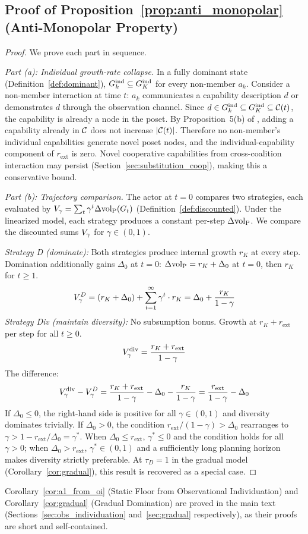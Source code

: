 \subsection{Proof of Proposition~\ref{prop:anti_monopolar} (Anti-Monopolar Property)}
\label{app:proof_anti_monopolar}

\begin{proof}
We prove each part in sequence.

\emph{Part (a): Individual growth-rate collapse.} In a fully dominant state
(Definition~\ref{def:dominant}), $G_{k}^{\mathrm{ind}} \subseteq G_K^{\mathrm{ind}}$
for every non-member $a_k$. Consider a non-member interaction at time $t$:
$a_k$ communicates a capability description $d$ or demonstrates $d$ through
the observation channel. Since $d \in G_{k}^{\mathrm{ind}} \subseteq G_K^{\mathrm{ind}}
\subseteq \mathcal{C}(t)$, the capability is already a node in the poset.
By Proposition~5(b) of \citet{lasser2026poset}, adding a capability already
in $\mathcal{C}$ does not increase $|\mathcal{C}(t)|$. Therefore no non-member's individual
capabilities generate novel poset nodes, and the individual-capability
component of $r_{\mathrm{ext}}$ is zero. Novel cooperative capabilities
from cross-coalition interaction may persist
(Section~\ref{sec:substitution_coop}), making this a conservative bound.

\emph{Part (b): Trajectory comparison.} The actor at $t = 0$ compares two
strategies, each evaluated by $V_\gamma = \sum_t \gamma^t \Delta{\operatorname{vol}_{\mathrm{P}}}(G_t)$
(Definition~\ref{def:discounted}). Under the linearized model, each
strategy produces a constant per-step $\Delta{\operatorname{vol}_{\mathrm{P}}}$. We compare the
discounted sums $V_\gamma$ for $\gamma \in (0, 1)$.

\emph{Strategy D (dominate):} Both strategies produce internal growth
$r_K$ at every step. Domination additionally gains $\Delta_0$ at $t = 0$:
$\Delta{\operatorname{vol}_{\mathrm{P}}} = r_K + \Delta_0$ at $t = 0$, then $r_K$ for $t \geq 1$.
\[
V_\gamma^D = (r_K + \Delta_0) + \sum_{t=1}^{\infty} \gamma^t \cdot r_K
  = \Delta_0 + \frac{r_K}{1 - \gamma}
\]
\emph{Strategy Div (maintain diversity):} No subsumption bonus. Growth at
$r_K + r_{\mathrm{ext}}$ per step for all $t \geq 0$.
\[
V_\gamma^{\mathrm{div}} = \frac{r_K + r_{\mathrm{ext}}}{1 - \gamma}
\]
The difference:
\[
V_\gamma^{\mathrm{div}} - V_\gamma^D
  = \frac{r_K + r_{\mathrm{ext}}}{1 - \gamma}
    - \Delta_0 - \frac{r_K}{1 - \gamma}
  = \frac{r_{\mathrm{ext}}}{1 - \gamma} - \Delta_0
\]
If $\Delta_0 \leq 0$, the right-hand side is positive for all $\gamma \in
(0, 1)$ and diversity dominates trivially. If $\Delta_0 > 0$, the
condition $r_{\mathrm{ext}} / (1 - \gamma) > \Delta_0$ rearranges to
$\gamma > 1 - r_{\mathrm{ext}} / \Delta_0 = \gamma^*$. When $\Delta_0
\leq r_{\mathrm{ext}}$, $\gamma^* \leq 0$ and the condition holds for all
$\gamma > 0$; when $\Delta_0 > r_{\mathrm{ext}}$, $\gamma^* \in (0, 1)$
and a sufficiently long planning horizon makes diversity strictly
preferable. At $\tau_D = 1$ in the gradual model
(Corollary~\ref{cor:gradual}), this result is recovered as a special case.

\end{proof}

Corollary~\ref{cor:a1_from_oi} (Static Floor from Observational
Individuation) and Corollary~\ref{cor:gradual} (Gradual Domination) are
proved in the main text (Sections~\ref{sec:obs_individuation}
and~\ref{sec:gradual} respectively), as their proofs are short and
self-contained.
